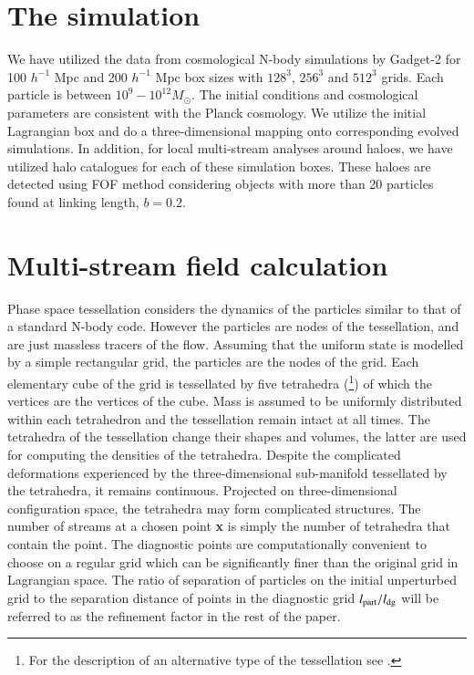  


\section{The simulation}
\label{sec:simulation}


We have utilized the data from cosmological N-body simulations by Gadget-2 \citep{Springel2005} for 100 $h^{-1}$ Mpc  and 200 $h^{-1}$ Mpc box 
sizes with $128^3$, $256^3$ and $512^3$ grids. Each particle is between  $10^9 - 10^{12} M_{\odot}$. 
The initial conditions and cosmological parameters are consistent with the Planck cosmology. We utilize the initial Lagrangian box and do a three-dimensional mapping onto corresponding evolved simulations. In addition, for local multi-stream analyses around haloes, we have utilized halo catalogues for each of these simulation boxes. These haloes are detected using FOF method considering objects with more than 20 particles found at linking length, $ b= 0.2$.  
\section{Multi-stream field calculation}
\label{subsec:method}

Phase space tessellation considers the dynamics of the particles similar to that of a standard N-body code. 
However the particles are nodes of the tessellation, and are just massless tracers of the flow.
Assuming that the uniform state is modelled by a simple rectangular grid, the particles are the nodes of the grid.
Each elementary cube of the grid is tessellated by five tetrahedra (\citealt{Shandarin2012}\footnote{For the description of an alternative type of the tessellation see \citet{Abel2012}.}) of which the vertices are the
vertices of the cube. Mass is assumed to be uniformly distributed within each tetrahedron and the tessellation remain
intact at all times. The tetrahedra of the tessellation change their shapes and volumes, the latter are used for
computing the densities of the tetrahedra. Despite the complicated deformations experienced by the three-dimensional
sub-manifold tessellated by the tetrahedra, it remains continuous. Projected on three-dimensional configuration space, the tetrahedra
may form complicated structures. The number of streams at a chosen point {\bf x} is simply the number of tetrahedra that contain the point. The diagnostic points are computationally convenient to choose on a regular grid which can be significantly finer than the original grid in Lagrangian space. The ratio of separation of particles on the initial unperturbed grid to the separation distance of points in the diagnostic grid  $l_{\rm part}/l_{\rm dg} $ will be referred to as the refinement factor in the rest of the paper.

